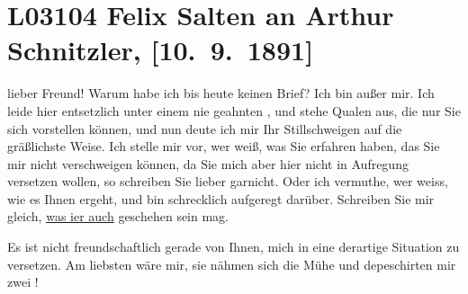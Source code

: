 

\section[Felix Salten an Arthur Schnitzler, {[}10. 9. 1891{]}]{L03104 Felix Salten an Arthur Schnitzler, {[}10. 9. 1891{]}}
\nopagebreak{}
\rehead{ }\normalsize\beginnumbering{}
\toendnotes[C]{\smallbreak\pagebreak[2]}
\toendnotes[C]{\smallbreak}
\pstart
           \noindent{}{\pb}lieber Freund! Warum habe ich bis heute keinen Brief? Ich bin außer mir. Ich leide hier entsetzlich unter einem
               nie geahnten \label{K_L03104-1v}\label{K_L03104-1}, und stehe Qualen aus, die nur Sie sich vorstellen können, und nun deute ich
               mir Ihr Stillschweigen auf die gräßlichste Weise. Ich stelle mir vor, wer weiß, was
               Sie erfahren haben,  das Sie mir nicht verschweigen
               können, da Sie mich aber hier nicht in Aufregung
               versetzen wollen, so schreiben Sie lieber garnicht. Oder ich vermuthe, wer weiss, wie
               es Ihnen  ergeht, und bin schrecklich aufgeregt
               darüber. Schreiben Sie mir gleich, \uline{was i{\geminationm}er auch} geschehen sein mag.\pend
           
\pstart
           Es ist nicht freundschaftlich gerade von {\pb}Ihnen, mich in eine
               derartige Situation zu versetzen. Am liebsten wäre mir, sie nähmen sich die Mühe und
               depeschirten mir zwei \label{K_L03104-2v}\label{K_L03104-2}!\pend
           
